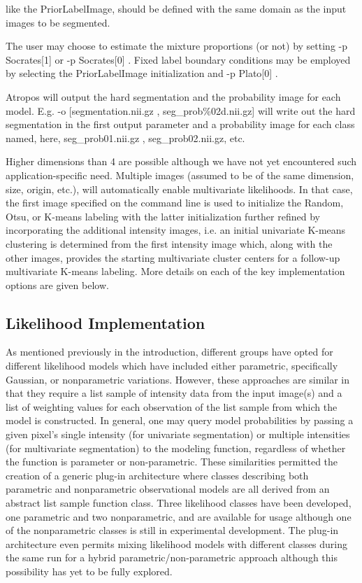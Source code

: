 \documentclass[11pt,english]{article}
\begin{document}
{\begin{description}
\begin{itemize}
  like the PriorLabelImage, should be defined with the same domain as
  the input images to be segmented.  
\end{itemize}
\item[Posterior formulation:]  The user may choose to estimate the
  mixture proportions (or not) by setting  {\ttfamily -p Socrates[1]}
  or {\ttfamily -p Socrates[0] }.  Fixed label boundary conditions may be employed by
  selecting the PriorLabelImage initialization and   {\ttfamily -p Plato[0] }.
\item[Output:] Atropos will output the hard segmentation and the
  probability image for each model.  E.g.  {\ttfamily -o
    [segmentation.nii.gz , seg\_prob\%02d.nii.gz] } will write
  out the hard segmentation in the first output parameter and a
  probability image for each class named, here, seg\_prob01.nii.gz ,
  seg\_prob02.nii.gz, etc. 
\end{description}
Higher dimensions than 4 are possible although we have not yet encountered such 
application-specific need.  Multiple images (assumed to be of the same
dimension, size, origin, etc.), will automatically enable multivariate
likelihoods.  In that case, the first image specified on the 
command line is used to initialize the Random, Otsu, or K-means labeling with the latter initialization further
refined by incorporating the additional intensity images, i.e. an initial univariate K-means clustering is determined 
from the first intensity image which, along with the other images, provides the starting multivariate cluster centers for a 
follow-up multivariate K-means labeling.    More details on each of
the key implementation options are given below.  

\subsection{Likelihood Implementation}
As mentioned previously in the introduction, different groups have
opted for different likelihood models which have included either
parametric, specifically Gaussian, or nonparametric variations.
However, these approaches are similar in that they require a list
sample of intensity data from the input image(s) and a list of
weighting values for each observation of the list sample from which
the model is constructed.  In general, one may query model
probabilities by passing a given pixel's single intensity (for
univariate segmentation) or multiple intensities (for multivariate
segmentation) to the modeling function, regardless of whether the
function is parameter or non-parametric.  These similarities permitted
the creation of a generic plug-in architecture where classes
describing both parametric and nonparametric observational models are
all derived from an abstract list sample function class.  Three
likelihood classes have been developed, one parametric and two
nonparametric, and are available for usage although one of the
nonparametric classes is still in experimental development.  The
plug-in architecture even permits mixing likelihood models with
different classes during the same run for a hybrid
parametric/non-parametric approach although this possibility has yet
to be fully explored.

}
\end{document}
